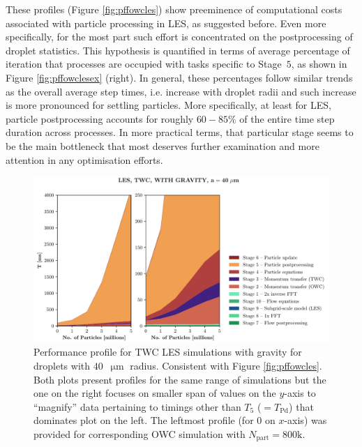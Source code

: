 \documentclass{pracamgren}
\begin{document}
These profiles (Figure \ref{fig:pffowcles}) show preeminence of computational costs associated with particle processing in LES, as suggested before.
Even more specifically, for the most part such effort is concentrated on the postprocessing of droplet statistics.
This hypothesis is quantified in terms of average percentage of iteration that processes are occupied with tasks specific to Stage~$5$, as shown in Figure \ref{fig:pffowclesex} (right).
In general, these percentages follow similar trends as the overall average step times, i.e. increase with droplet radii and such increase is more pronounced for settling particles.
More specifically, at least for LES, particle postprocessing accounts for roughly $60-85 \%$ of the entire time step duration across processes.
In more practical terms, that particular stage seems to be the main bottleneck that most deserves further examination and more attention in any optimisation efforts.  

\begin{figure}[ht]
\centering
\includegraphics[width=13.5cm]{figures/3-08_pfftwcles.pdf}
\caption{
Performance profile for TWC LES simulations with gravity for droplets with $40$~$\upmu\text{m}$ radius.
Consistent with Figure \ref{fig:pffowcles}.
Both plots present profiles for the same range of simulations but the one on the right focuses on smaller span of values on the $y$-axis to ``magnify'' data pertaining to timings other than $T_5$ ($ = T_{\text{Pd}}$) that dominates plot on the left.
The leftmost profile (for $0$ on $x$-axis) was provided for corresponding OWC simulation with $N_{\text{part}} = 800\text{k}$. 
}
\label{fig:pfftwcles}
\end{figure}
\end{document}
